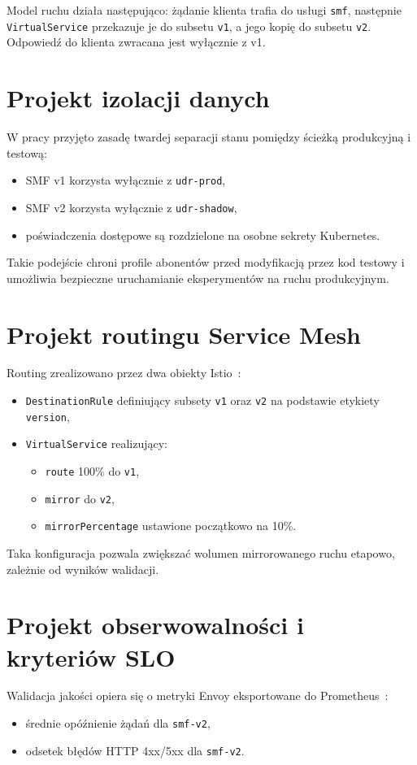 Model ruchu działa następująco: żądanie klienta trafia do usługi \texttt{smf}, następnie \texttt{VirtualService} przekazuje je do subsetu \texttt{v1}, a jego kopię do subsetu \texttt{v2}. Odpowiedź do klienta zwracana jest wyłącznie z v1.

\section{Projekt izolacji danych}
W pracy przyjęto zasadę twardej separacji stanu pomiędzy ścieżką produkcyjną i testową:
\begin{itemize}
    \item SMF v1 korzysta wyłącznie z \texttt{udr-prod},
    \item SMF v2 korzysta wyłącznie z \texttt{udr-shadow},
    \item poświadczenia dostępowe są rozdzielone na osobne sekrety Kubernetes.
\end{itemize}

Takie podejście chroni profile abonentów przed modyfikacją przez kod testowy i umożliwia bezpieczne uruchamianie eksperymentów na ruchu produkcyjnym.

\section{Projekt routingu Service Mesh}
Routing zrealizowano przez dwa obiekty Istio~\cite{istioDestinationRule,istioVirtualService}:
\begin{itemize}
    \item \texttt{DestinationRule} definiujący subsety \texttt{v1} oraz \texttt{v2} na podstawie etykiety \texttt{version},
    \item \texttt{VirtualService} realizujący:
    \begin{itemize}
        \item \texttt{route} 100\% do \texttt{v1},
        \item \texttt{mirror} do \texttt{v2},
        \item \texttt{mirrorPercentage} ustawione początkowo na 10\%.
    \end{itemize}
\end{itemize}

Taka konfiguracja pozwala zwiększać wolumen mirrorowanego ruchu etapowo, zależnie od wyników walidacji.

\section{Projekt obserwowalności i kryteriów SLO}
Walidacja jakości opiera się o metryki Envoy eksportowane do Prometheus~\cite{prometheusDocs}:
\begin{itemize}
    \item średnie opóźnienie żądań dla \texttt{smf-v2},
    \item odsetek błędów HTTP 4xx/5xx dla \texttt{smf-v2}.
\end{itemize}


